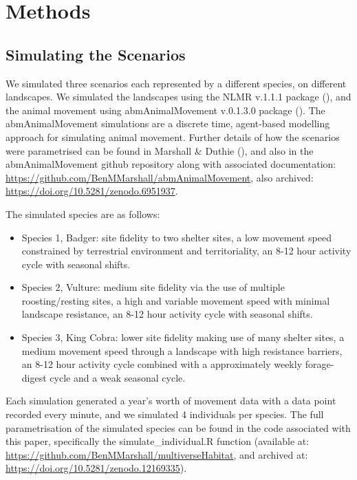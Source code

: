 \documentclass[10pt,a4paper]{article}
\begin{document}
\section{Methods}\label{methods}

\subsection{Simulating the Scenarios}\label{simulating-the-scenarios}

We simulated three scenarios each represented by a different species, on different landscapes.
We simulated the landscapes using the NLMR v.1.1.1 package (), and the animal movement using abmAnimalMovement v.0.1.3.0 package ().
The abmAnimalMovement simulations are a discrete time, agent-based modelling approach for simulating animal movement.
Further details of how the scenarios were parametrised can be found in Marshall \& Duthie (), and also in the abmAnimalMovement github repository along with associated documentation: \href{https://github.com/BenMMarshall/abmAnimalMovement/tree/main/notebook/manuscript}{https://github.com/BenMMarshall/abmAnimalMovement}, also archived: \url{https://doi.org/10.5281/zenodo.6951937}.

The simulated species are as follows:

\begin{itemize}
\item
  Species 1, Badger: site fidelity to two shelter sites, a low movement speed constrained by terrestrial environment and territoriality, an 8-12 hour activity cycle with seasonal shifts.
\item
  Species 2, Vulture: medium site fidelity via the use of multiple roosting/resting sites, a high and variable movement speed with minimal landscape resistance, an 8-12 hour activity cycle with seasonal shifts.
\item
  Species 3, King Cobra: lower site fidelity making use of many shelter sites, a medium movement speed through a landscape with high resistance barriers, an 8-12 hour activity cycle combined with a approximately weekly forage-digest cycle and a weak seasonal cycle.
\end{itemize}

Each simulation generated a year's worth of movement data with a data point recorded every minute, and we simulated 4 individuals per species.
The full parametrisation of the simulated species can be found in the code associated with this paper, specifically the simulate\_individual.R function (available at: \url{https://github.com/BenMMarshall/multiverseHabitat}, and archived at: \url{https://doi.org/10.5281/zenodo.12169335}).
\end{document}
